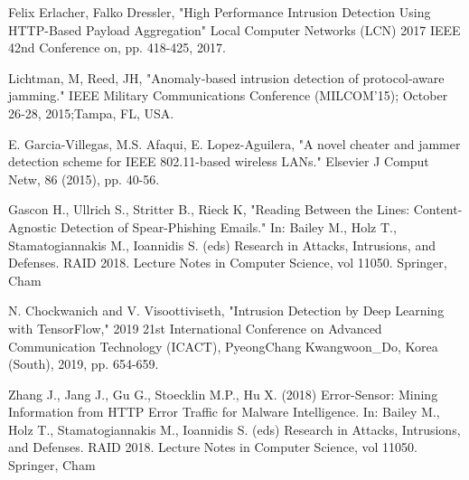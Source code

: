\documentclass[12pt]{article} %
\begin{document}
\begin{thebibliography}{99}
 Felix Erlacher, Falko Dressler, "High Performance Intrusion Detection Using HTTP-Based Payload Aggregation" Local Computer Networks (LCN) 2017 IEEE 42nd Conference on, pp. 418-425, 2017.

 Lichtman, M, Reed, JH, "Anomaly‐based intrusion detection of protocol‐aware jamming." IEEE Military Communications Conference (MILCOM'15); October 26‐28, 2015;Tampa, FL, USA.

 E. Garcia-Villegas, M.S. Afaqui, E. Lopez-Aguilera, "A novel cheater and jammer detection scheme for IEEE 802.11-based wireless LANs." Elsevier J Comput Netw, 86 (2015), pp. 40-56.

 Gascon H., Ullrich S., Stritter B., Rieck K, "Reading Between the Lines: Content-Agnostic Detection of Spear-Phishing Emails." In: Bailey M., Holz T., Stamatogiannakis M., Ioannidis S. (eds) Research in Attacks, Intrusions, and Defenses. RAID 2018. Lecture Notes in Computer Science, vol 11050. Springer, Cham

 N. Chockwanich and V. Visoottiviseth, "Intrusion Detection by Deep Learning with TensorFlow," 2019 21st International Conference on Advanced Communication Technology (ICACT), PyeongChang Kwangwoon\_Do, Korea (South), 2019, pp. 654-659.

Zhang J., Jang J., Gu G., Stoecklin M.P., Hu X. (2018) Error-Sensor: Mining Information from HTTP Error Traffic for Malware Intelligence. In: Bailey M., Holz T., Stamatogiannakis M., Ioannidis S. (eds) Research in Attacks, Intrusions, and Defenses. RAID 2018. Lecture Notes in Computer Science, vol 11050. Springer, Cham

\end{thebibliography}
\end{document}
